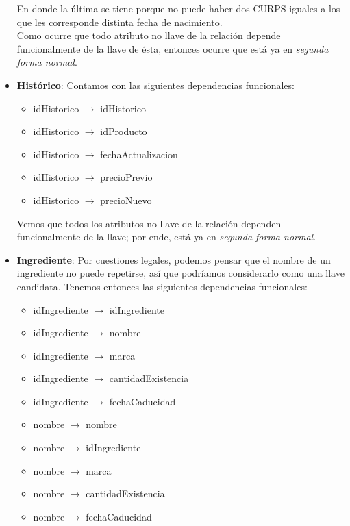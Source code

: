 \documentclass[11pt,letterpaper]{article}
\begin{document}
\begin{itemize}
En donde la última se tiene porque no puede haber dos CURPS iguales a los que les corresponde distinta fecha de nacimiento.\\

Como ocurre que todo atributo no llave de la relación depende funcionalmente de la llave de ésta, entonces ocurre que está ya en \textit{segunda forma normal}. 

\item \textbf{Histórico}: Contamos con las siguientes dependencias funcionales:

\begin{itemize}
\item idHistorico $\rightarrow$ idHistorico

\item idHistorico $\rightarrow$ idProducto
\item idHistorico $\rightarrow$ fechaActualizacion
\item idHistorico $\rightarrow$ precioPrevio
\item idHistorico $\rightarrow$ precioNuevo
\end{itemize}

Vemos que todos los atributos no llave de la relación dependen funcionalmente de la llave; por ende, está ya en \textit{segunda forma normal}.  

\item \textbf{Ingrediente}: Por cuestiones legales, podemos pensar que el nombre de un ingrediente no puede repetirse, así que podríamos considerarlo como una llave candidata. Tenemos entonces las siguientes dependencias funcionales:

\begin{itemize}
\item idIngrediente $\rightarrow$ idIngrediente

\item idIngrediente $\rightarrow$ nombre
\item idIngrediente $\rightarrow$ marca
\item idIngrediente $\rightarrow$ cantidadExistencia
\item idIngrediente $\rightarrow$ fechaCaducidad


\item nombre $\rightarrow$ nombre

\item nombre $\rightarrow$ idIngrediente
\item nombre $\rightarrow$ marca
\item nombre $\rightarrow$ cantidadExistencia
\item nombre $\rightarrow$ fechaCaducidad
\end{itemize}


\end{itemize}
\end{document}
